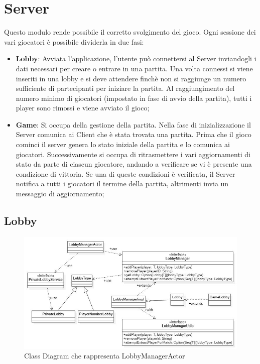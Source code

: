 \section{Server}
Questo modulo rende possibile il corretto svolgimento del gioco. Ogni sessione dei vari giocatori \`e possibile dividerla in due fasi:
\begin{itemize}
    \item \textbf{Lobby}: Avviata l'applicazione, l'utente pu\`o connettersi al Server inviandogli i dati necessari per creare o entrare in una partita. Una volta connessi si viene inseriti in una lobby e si deve attendere finch\`e non si raggiunge un numero sufficiente di partecipanti per iniziare la partita. Al raggiungimento del numero minimo di giocatori (impostato in fase di avvio della partita), tutti i player sono rimossi e viene avviato il gioco;
    \item \textbf{Game}: Si occupa della gestione della partita. Nella fase di inizializzazione il Server comunica ai Client che \`e stata trovata una partita. Prima che il gioco cominci il server genera lo stato iniziale della partita e lo comunica ai giocatori. Successivamente si occupa di ritrasmettere i vari aggiornamenti di stato da parte di ciascun giocatore, andando a verificare se vi \`e presente una condizione di vittoria. Se una di queste condizioni \`e verificata, il Server notifica a tutti i giocatori il termine della partita, altrimenti invia un messaggio di aggiornamento;
\end{itemize}

\subsection{Lobby}
\begin{figure}[ht]
\centering
\includegraphics[width=\textwidth, scale=0.44]{img/LobbyUML.jpg}
\caption{Class Diagram che rappresenta LobbyManagerActor}
\label{fig:ClasDiagRaprLobbyManagerActor}
\end{figure}


